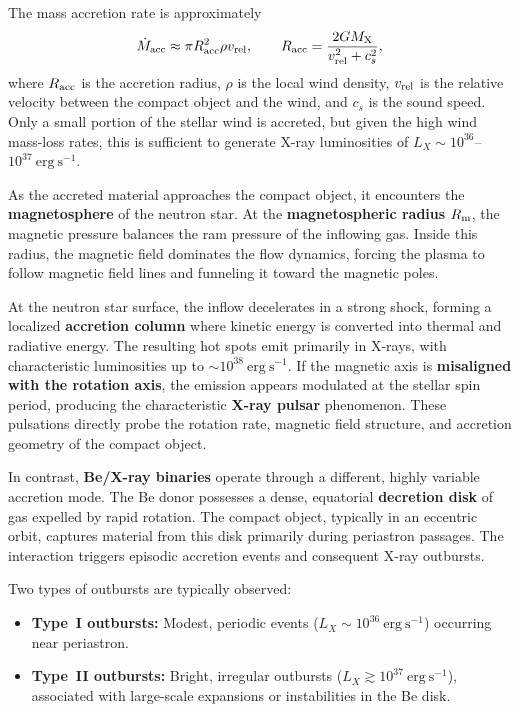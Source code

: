 \par
The mass accretion rate is approximately
\[
\dot{M}_{\rm acc} \approx \pi R_{\rm acc}^2 \rho v_{\rm rel},
\qquad
R_{\rm acc} = \frac{2 G M_{\rm X}}{v_{\rm rel}^2 + c_s^2},
\]
where $R_{\rm acc}$ is the accretion radius, $\rho$ is the local wind density, $v_{\rm rel}$ is the relative velocity between the compact object and the wind, and $c_s$ is the sound speed. Only a small portion of the stellar wind is accreted, but given the high wind mass-loss rates, this is sufficient to generate X-ray luminosities of $L_X \sim 10^{36}$--$10^{37}~\mathrm{erg~s^{-1}}$.

\par
As the accreted material approaches the compact object, it encounters the \textbf{magnetosphere} of the neutron star. At the \textbf{magnetospheric radius} $R_{\rm m}$, the magnetic pressure balances the ram pressure of the inflowing gas. Inside this radius, the magnetic field dominates the flow dynamics, forcing the plasma to follow magnetic field lines and funneling it toward the magnetic poles. 

\par
At the neutron star surface, the inflow decelerates in a strong shock, forming a localized \textbf{accretion column} where kinetic energy is converted into thermal and radiative energy. The resulting hot spots emit primarily in X-rays, with characteristic luminosities up to $\sim 10^{38}~\mathrm{erg~s^{-1}}$. If the magnetic axis is \textbf{misaligned with the rotation axis}, the emission appears modulated at the stellar spin period, producing the characteristic \textbf{X-ray pulsar} phenomenon. These pulsations directly probe the rotation rate, magnetic field structure, and accretion geometry of the compact object.

\par
In contrast, \textbf{Be/X-ray binaries} operate through a different, highly variable accretion mode. The Be donor possesses a dense, equatorial \textbf{decretion disk} of gas expelled by rapid rotation. The compact object, typically in an eccentric orbit, captures material from this disk primarily during periastron passages. The interaction triggers episodic accretion events and consequent X-ray outbursts. 

\par
Two types of outbursts are typically observed:
\begin{itemize}
    \item \textbf{Type~I outbursts:} Modest, periodic events ($L_X \sim 10^{36}~\mathrm{erg~s^{-1}}$) occurring near periastron.
    \item \textbf{Type~II outbursts:} Bright, irregular outbursts ($L_X \gtrsim 10^{37}~\mathrm{erg~s^{-1}}$), associated with large-scale expansions or instabilities in the Be disk.
\end{itemize}


